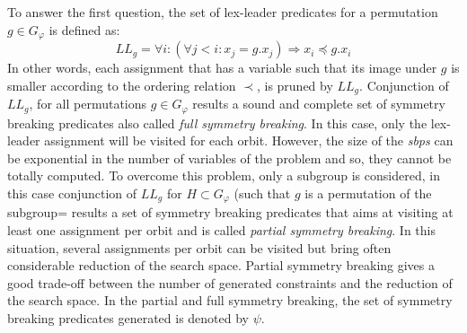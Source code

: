 To answer the first question, the set of lex-leader predicates for a permutation $g \in G_\varphi$ is defined as:
$$LL_g = \forall i : (\forall j < i : x_j = g.x_j) \Rightarrow  x_i \preceq g.x_i$$
In other words, each assignment that has a variable such that its image under $g$ is smaller according to the ordering relation $\prec$, is pruned by $LL_g$.
Conjunction of $LL_g$, for all permutations  $g \in G_{\varphi} $ results a sound and complete set of symmetry breaking predicates also called \emph{full symmetry breaking}.
In this case, only the lex-leader assignment will be visited for each orbit.
However, the size of the \textit{sbps} can be exponential in the number of variables of the problem and so, they cannot be totally computed.
To overcome this problem, only a subgroup is considered, in this case 
conjunction of $LL_g$ for $H \subset G_{\varphi}$ (such that $g$ is a permutation of the subgroup= results a set of symmetry breaking predicates 
that aims at visiting at least one assignment per orbit and is called \emph{partial symmetry breaking}.
In this situation, several assignments per orbit can be visited but bring often considerable reduction of the
search space. Partial symmetry breaking gives a good trade-off between the number of generated constraints and the reduction of the search space.
In the partial and full symmetry breaking, the set of symmetry breaking predicates generated is denoted by $\psi$.
%
%

